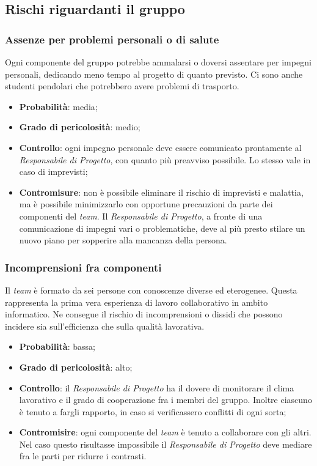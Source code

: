 \subsection{Rischi riguardanti il gruppo}

\subsubsection{Assenze per problemi personali o di salute}
\label{sec:Assenze}
Ogni componente del gruppo potrebbe ammalarsi o doversi assentare per impegni personali, dedicando meno tempo al progetto di quanto previsto. Ci sono anche studenti pendolari che potrebbero avere problemi di trasporto.
\begin{itemize}
\item \textbf{Probabilità}: media;
\item \textbf{Grado di pericolosità}: medio;
\item \textbf{Controllo}: ogni impegno personale deve essere comunicato prontamente al \textit{Responsabile di Progetto}, con quanto più preavviso possibile. Lo stesso vale in caso di imprevisti;
\item \textbf{Contromisure}: non è possibile eliminare il rischio di imprevisti e malattia, ma è possibile minimizzarlo con opportune precauzioni da parte dei componenti del \textit{team}. Il \textit{Responsabile di Progetto}, a fronte di una comunicazione di impegni vari o problematiche, deve al più presto stilare un nuovo piano per sopperire alla mancanza della persona.
\end{itemize}

\subsubsection{Incomprensioni fra componenti}
\label{sec:Incomp}
Il \textit{team} è formato da sei persone con conoscenze diverse ed eterogenee. Questa rappresenta la prima vera esperienza di lavoro collaborativo in ambito informatico. Ne consegue il rischio di incomprensioni o dissidi che possono incidere sia sull'efficienza che sulla qualità lavorativa.
\begin{itemize}
\item \textbf{Probabilità}: bassa;
\item \textbf{Grado di pericolosità}: alto;
\item \textbf{Controllo}: il \textit{Responsabile di Progetto} ha il dovere di monitorare il clima lavorativo e il grado di cooperazione fra i membri del gruppo. Inoltre ciascuno è tenuto a fargli rapporto, in caso si verificassero conflitti di ogni sorta;
\item \textbf{Contromisire}: ogni componente del \textit{team} è tenuto a collaborare con gli altri. Nel caso questo risultasse impossibile il \textit{Responsabile di Progetto} deve mediare fra le parti per ridurre i contrasti.
\end{itemize}


